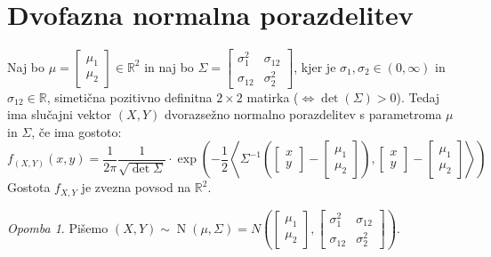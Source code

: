\documentclass[12pt]{book}
\theoremstyle{definition}
\theoremstyle{plain}
\theoremstyle{plain}
\theoremstyle{plain}
\theoremstyle{plain}
\theoremstyle{remark}
\newtheorem*{opomba}{Opomba}
\begin{document}
\section{Dvofazna normalna porazdelitev}

Naj bo $\mu=\begin{bmatrix}\mu_1 \\ \mu_2 \end{bmatrix} \in \mathbb{R}^2$ in naj bo $\Sigma=\begin{bmatrix} \sigma_1^2 & \sigma_{12} \\ \sigma_{12} & \sigma_2^2\end{bmatrix}$, kjer je $\sigma_1, \sigma_2 \in(0, \infty)$ in $\sigma_{12} \in \mathbb{R}$, simetična pozitivno definitna $2 \times 2$ matirka ($\iff \det (\Sigma) > 0$). Tedaj ima slučajni vektor $(X,Y)$ dvorazsežno normalno porazdelitev s parametroma $\mu$ in $\Sigma$, če ima gostoto: 
$$
f_{(X,Y)}(x, y)=\frac{1}{2 \pi} \frac{1}{\sqrt{\operatorname{det} \Sigma}} \cdot \exp \left(-\frac{1}{2}\left\langle\Sigma^{-1}\left(\begin{bmatrix} x \\ y \end{bmatrix}-\begin{bmatrix} \mu_1 \\ \mu_2 \end{bmatrix}\right),\begin{bmatrix} x \\ y \end{bmatrix}-\begin{bmatrix} \mu_1 \\ \mu_2 \end{bmatrix} \right\rangle \right)
$$
Gostota $f_{X,Y}$ je zvezna povsod na $\mathbb{R}^2$. 

\begin{opomba}
    Pišemo $(X, Y) \sim \operatorname{N}(\mu, \Sigma)=N\left(\begin{bmatrix} \mu_1 \\ \mu_2 \end{bmatrix},\begin{bmatrix} \sigma_1^2 & \sigma_{12} \\ \sigma_{12} & \sigma_2^2 \end{bmatrix}\right)$.
\end{opomba}
\end{document}
